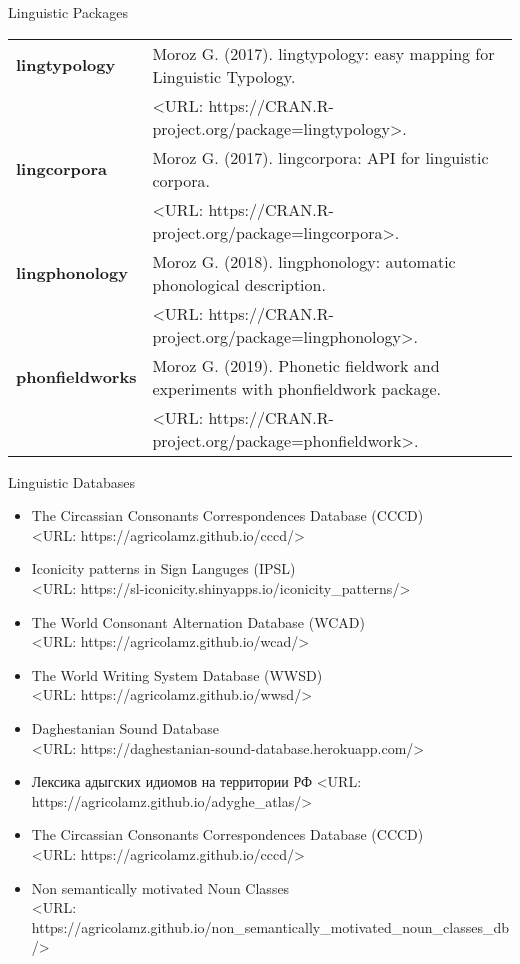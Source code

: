 \documentclass{resume} %
\begin{document}
\begin{rSection}{Linguistic Packages}
\begin{tabular}{ @{} >{\bfseries}l @{\hspace{6ex}} l }
lingtypology  & Moroz G. (2017). lingtypology: easy mapping for Linguistic Typology. \\
& <URL: https://CRAN.R-project.org/package=lingtypology>.\\
lingcorpora & Moroz G. (2017). lingcorpora: API for linguistic corpora.\\
& <URL: https://CRAN.R-project.org/package=lingcorpora>.\\
lingphonology & Moroz G. (2018). lingphonology: automatic phonological description. \\
& <URL: https://CRAN.R-project.org/package=lingphonology>.\\
phonfieldworks & Moroz G. (2019). Phonetic fieldwork and experiments with phonfieldwork
package.\\
& <URL: https://CRAN.R-project.org/package=phonfieldwork>.\\
\end{tabular}

\end{rSection}

\begin{rSection}{Linguistic Databases}
\begin{itemize}
\item The Circassian Consonants Correspondences Database (CCCD) \\ <URL: https://agricolamz.github.io/cccd/> 
\item Iconicity patterns in Sign Languges (IPSL) \\ <URL: https://sl-iconicity.shinyapps.io/iconicity\_patterns/>
\item The World Consonant Alternation Database (WCAD) \\ <URL: https://agricolamz.github.io/wcad/>
\item The World Writing System Database (WWSD) \\ <URL: https://agricolamz.github.io/wwsd/>
\item Daghestanian Sound Database \\ <URL: https://daghestanian-sound-database.herokuapp.com/>
\item Лексика адыгских идиомов на территории РФ <URL: https://agricolamz.github.io/adyghe\_atlas/>
\item The Circassian Consonants Correspondences Database (CCCD) \\ <URL: https://agricolamz.github.io/cccd/>
\item Non semantically motivated Noun Classes \\ <URL: https://agricolamz.github.io/non\_semantically\_motivated\_noun\_classes\_db/> \vspace{0.6cm}
\end{itemize}
\end{rSection}
\end{document}
